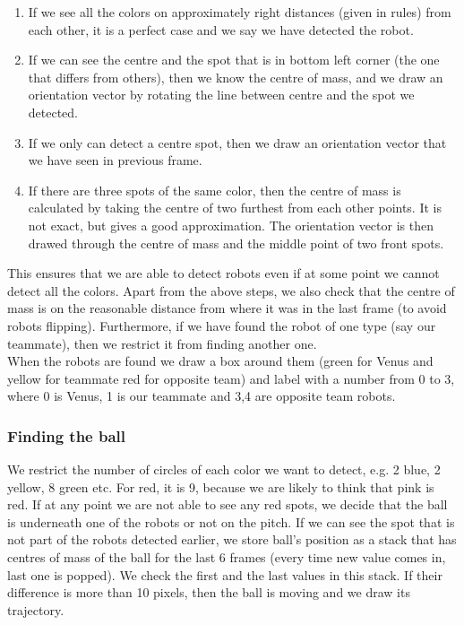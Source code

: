 \documentclass[a4paper,12pt]{article}
\begin{document}
\begin{enumerate}
\item If we see all the colors on approximately right distances (given in rules) from each other, it is a perfect case and we say we have detected the robot.
\item If we can see the centre and the spot that is in bottom left corner (the one that differs from others), then we know the centre of mass, and we draw an orientation vector by rotating the line between centre and the spot we detected.
\item If we only can detect a centre spot, then we draw an orientation vector that we have seen in previous frame.
\item If there are three spots of the same color, then the centre of mass is calculated by taking the centre of two furthest from each other points. It is not exact, but gives a good approximation. The orientation vector is then drawed through the centre of mass and the middle point of two front spots.
\end{enumerate}
This ensures that we are able to detect robots even if at some point we cannot detect all the colors. Apart from the above steps, we also check that the centre of mass is on the reasonable distance from where it was in the last frame (to avoid robots flipping). Furthermore, if we have found the robot of one type (say our teammate), then we restrict it from finding another one. 
\\When the robots are found we draw a box around them (green for Venus and yellow for teammate red for opposite team) and label with a number from 0 to 3, where 0 is Venus, 1 is our teammate and 3,4 are opposite team robots. 

\subsubsection{Finding the ball}

We restrict the number of circles of each color we want to detect, e.g. 2 blue, 2 yellow, 8 green etc. For red, it is 9, because we are likely to think that pink is red. If at any point we are not able to see any red spots, we decide that the ball is underneath one of the robots or not on the pitch. If we can see the spot that is not part of the robots detected earlier, we store ball's position as a stack that has centres of mass of the ball for the last 6 frames (every time new value comes in, last one is popped). We check the first and the last values in this stack. If their difference is more than 10 pixels, then the ball is moving and we draw its trajectory.  
\end{document}
